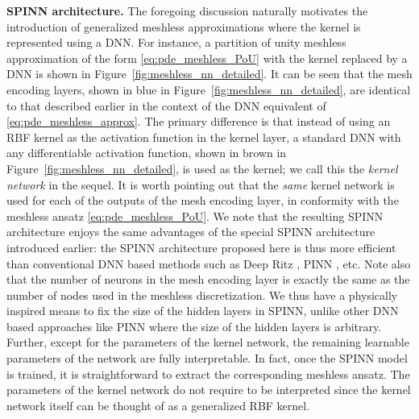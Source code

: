 \documentclass[12pt]{article}
\begin{document}
\textbf{SPINN architecture.} The foregoing discussion naturally motivates the introduction of generalized meshless approximations where the kernel is represented using a DNN. For instance, a partition of unity meshless approximation of the form \eqref{eq:pde_meshless_PoU} with the kernel replaced by a DNN is shown in Figure~\ref{fig:meshless_nn_detailed}. It can be seen that the mesh encoding layers, shown in blue in Figure~\ref{fig:meshless_nn_detailed}, are identical to that described earlier in the context of the DNN equivalent of \eqref{eq:pde_meshless_approx}. The primary difference is that instead of using an RBF kernel as the activation function in the kernel layer, a standard DNN with any differentiable activation function, shown in brown in Figure~\ref{fig:meshless_nn_detailed}, is used as the kernel; we call this the \emph{kernel network} in the sequel. It is worth pointing out that the \emph{same} kernel network is used for each of the outputs of the mesh encoding layer, in conformity with the meshless ansatz \eqref{eq:pde_meshless_PoU}. We note that the resulting SPINN architecture enjoys the same advantages of the special SPINN architecture introduced earlier: the SPINN architecture proposed here is thus more efficient than conventional DNN based methods such as Deep Ritz \cite{EYu2018}, PINN \cite{RPK2019}, etc. Note also that the number of neurons in the mesh encoding layer is exactly the same as the number of nodes used in the meshless discretization. We thus have a physically inspired means to fix the size of the hidden layers in SPINN, unlike other DNN based approaches like PINN where the size of the hidden layers is arbitrary.  Further, except for the parameters of the kernel network, the remaining learnable parameters of the network are fully interpretable. In fact, once the SPINN model is trained, it is straightforward to extract the corresponding meshless ansatz. The parameters of the kernel network do not require to be interpreted since the kernel network itself can be thought of as a generalized RBF kernel.  
\end{document}
